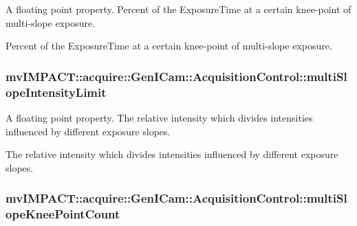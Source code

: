 A floating point property. Percent of the Exposure\+Time at a certain knee-\/point of multi-\/slope exposure. 

Percent of the Exposure\+Time at a certain knee-\/point of multi-\/slope exposure. \hypertarget{classmv_i_m_p_a_c_t_1_1acquire_1_1_gen_i_cam_1_1_acquisition_control_acb90c1e8ccca748148f9542b91eb3d3f}{
\subsubsection[{multi\+Slope\+Intensity\+Limit}]{ mv\+I\+M\+P\+A\+C\+T\+::acquire\+::\+Gen\+I\+Cam\+::\+Acquisition\+Control\+::multi\+Slope\+Intensity\+Limit}}\label{classmv_i_m_p_a_c_t_1_1acquire_1_1_gen_i_cam_1_1_acquisition_control_acb90c1e8ccca748148f9542b91eb3d3f}


A floating point property. The relative intensity which divides intensities influenced by different exposure slopes. 

The relative intensity which divides intensities influenced by different exposure slopes. \hypertarget{classmv_i_m_p_a_c_t_1_1acquire_1_1_gen_i_cam_1_1_acquisition_control_afc16354b0a7a9477a9dc50b3c0a50275}{
\subsubsection[{multi\+Slope\+Knee\+Point\+Count}]{ mv\+I\+M\+P\+A\+C\+T\+::acquire\+::\+Gen\+I\+Cam\+::\+Acquisition\+Control\+::multi\+Slope\+Knee\+Point\+Count}}\label{classmv_i_m_p_a_c_t_1_1acquire_1_1_gen_i_cam_1_1_acquisition_control_afc16354b0a7a9477a9dc50b3c0a50275}


